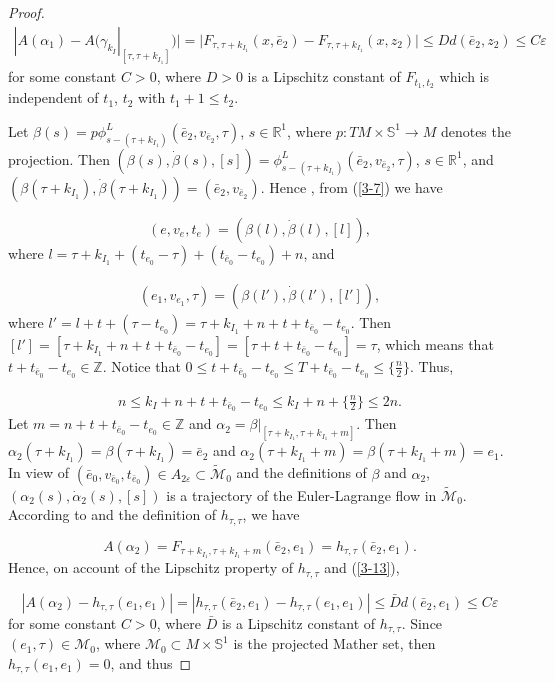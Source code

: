 \documentclass{amsart}[12pt]
\theoremstyle{definition}
\theoremstyle{remark}
\numberwithin{equation}{section}
\begin{document}
\begin{proof}
\begin{align}\label{3-14}
|A(\alpha_1)-A(\gamma_{k_I}|_{[\tau,\tau+k_{I_1}]})|=|F_{\tau,\tau+k_{I_1}}(x,\bar{e}_2)-F_{\tau,\tau+k_{I_1}}(x,z_2)|\leq
Dd(\bar{e}_2,z_2)\leq C\varepsilon
\end{align}
for some constant $C>0$, where $D>0$ is a Lipschitz constant of
$F_{t_1,t_2}$ which is independent of $t_1$, $t_2$ with $t_1+1\leq
t_2$.

Let
$\beta(s)=p\phi^L_{s-(\tau+k_{I_1})}(\bar{e}_2,v_{\bar{e}_2},\tau)$,
$s\in\mathbb{R}^1$, where $p:TM\times\mathbb{S}^1\to M$ denotes
the projection. Then
$(\beta(s),\dot{\beta}(s),[s])=\phi^L_{s-(\tau+k_{I_1})}(\bar{e}_2,v_{\bar{e}_2},\tau)$,
$s\in\mathbb{R}^1$, and
$(\beta(\tau+k_{I_1}),\dot{\beta}(\tau+k_{I_1}))=(\bar{e}_2,v_{\bar{e}_2})$.
Hence , from (\ref{3-7}) we have

\[
(e,v_e,t_e)=(\beta(l),\dot{\beta}(l),[l]),
\]
where $l=\tau+k_{I_1}+(t_{e_0}-\tau)+(t_{\bar{e}_0}-t_{e_0})+n$,
and

\begin{align*}
(e_1,v_{e_1},\tau) = (\beta(l'),\dot{\beta}(l'),[l']),
\end{align*}
where
$l'=l+t+(\tau-t_{e_0})=\tau+k_{I_1}+n+t+t_{\bar{e}_0}-t_{e_0}$.
Then
$[l']=[\tau+k_{I_1}+n+t+t_{\bar{e}_0}-t_{e_0}]=[\tau+t+t_{\bar{e}_0}-t_{e_0}]=\tau$,
which means that $t+t_{\bar{e}_0}-t_{e_0}\in\mathbb{Z}$. Notice
that $0\leq t+t_{\bar{e}_0}-t_{e_0}\leq
T+t_{\bar{e}_0}-t_{e_0}\leq\{\frac{n}{2}\}$. Thus,

\begin{align}\label{3-15}
n\leq k_I+n+t+t_{\bar{e}_0}-t_{e_0}\leq k_I+n+\{\frac{n}{2}\}\leq
2n.
\end{align}
Let $m=n+t+t_{\bar{e}_0}-t_{e_0}\in\mathbb{Z}$ and
$\alpha_2=\beta|_{[\tau+k_{I_1},\tau+k_{I_1}+m]}$. Then
$\alpha_2(\tau+k_{I_1})=\beta(\tau+k_{I_1})=\bar{e}_2$ and
$\alpha_2(\tau+k_{I_1}+m)=\beta(\tau+k_{I_1}+m)=e_1$. In view of
$(\bar{e}_0,v_{\bar{e}_0},t_{\bar{e}_0})\in
A_{2\varepsilon}\subset\tilde{\mathcal{M}}_0$ and the definitions
of $\beta$ and $\alpha_2$, $(\alpha_2(s),\dot{\alpha}_2(s),[s])$
is a trajectory of the Euler-Lagrange flow in
$\tilde{\mathcal{M}}_0$. According to \cite[Proposition 3]{Mat91}
and the definition of $h_{\tau,\tau}$, we have

\[
A(\alpha_2)=F_{\tau+k_{I_1},\tau+k_{I_1}+m}(\bar{e}_2,e_1)=h_{\tau,\tau}(\bar{e}_2,e_1).
\]
Hence, on account of the Lipschitz property of $h_{\tau,\tau}$ and
(\ref{3-13}),

\[
|A(\alpha_2)-h_{\tau,\tau}(e_1,e_1)|=
|h_{\tau,\tau}(\bar{e}_2,e_1)-h_{\tau,\tau}(e_1,e_1)|\leq\bar{D}d(\bar{e}_2,e_1)\leq
C\varepsilon
\]
for some constant $C>0$, where $\bar{D}$ is a Lipschitz constant
of $h_{\tau,\tau}$. Since $(e_1,\tau)\in\mathcal{M}_0$, where
$\mathcal{M}_0\subset M\times\mathbb{S}^1$ is the projected Mather
set, then $h_{\tau,\tau}(e_1,e_1)=0$, and thus


\end{proof}
\end{document}
